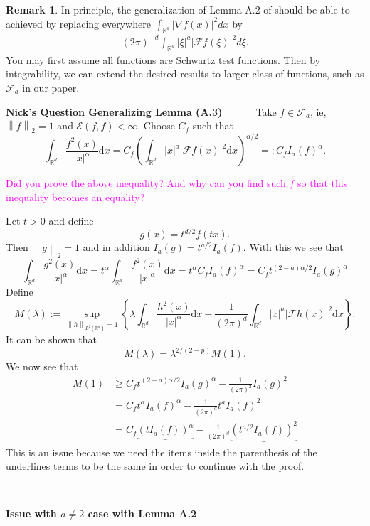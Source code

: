 \documentclass[a4paper,11pt]{article}
\numberwithin{equation}{section}
\theoremstyle{plain}
\theoremstyle{definition}
\newtheorem{remark}[theorem]{Remark}
\newcommand{\ud}{\ensuremath{\mathrm{d} }}
\newcommand{\Norm}[1]{\left\|  #1   \right\|}
\newcommand{\R}{\mathbb{R}}
\newcounter{NQ}
\newenvironment{NickQuestion}[1][] %
{\refstepcounter{NQ}
	\begin{mdframed}[backgroundcolor=lightgray]\textbf{Nick's Question \theNQ \: #1~~}~~~\noindent}%
	{\end{mdframed}}
\numberwithin{NQ}{section}
\numberwithin{LQ}{section}
\numberwithin{ZQ}{section}
\begin{document}
\begin{remark}
	In principle, the generalization of Lemma A.2 of \cite{ChenHuSongXing15AIHP} should be able to
	achieved by replacing everywhere $\int_{\R^d} |\nabla f(x)|^2 dx$ by
	\begin{align*}
		(2\pi)^{-d}\int_{\R^d} |\xi|^a |\mathcal{F}f(\xi)|^2 d\xi.
	\end{align*}
	You may first assume all functions are Schwartz test functions. Then by integrability, we can
	extend the desired results to larger class of functions, such as $\mathcal{F}_a$ in our paper.
\end{remark}

\begin{NickQuestion}[Generalizing Lemma (A.3) \cite{ChenAOP12}]
Take $f \in \mathcal{F}_a$, ie, $\Norm{f}_2 =1$ and $\mathcal{E}(f,f) < \infty$. Choose $C_f$ such that
	\[
		\int_{\R^d} \frac{f^2(x)}{|x|^{\alpha}} \ud x = C_f \left( \int_{\R^d} |x|^a |\mathcal{F}f(x)|^2 \ud x\right)^{\alpha/2} =: C_f I_a(f)^\alpha.
	\]

	\textcolor{magenta}{Did you prove the above inequality? And why can you find such $f$ so that this
	inequality becomes an equality?} \bigskip

Let $t >0$ and define
	\[
		g(x) = t^{d/2}f(tx).
	\]
Then $\Norm{g}_2 =1$ and in addition $I_a(g) = t^{a/2}I_a(f)$. With this we see that
	\[
		\int_{\R^d} \frac{g^2(x)}{|x|^\alpha} \ud x = t^\alpha \int_{\R^d} \frac{f^2(x)}{|x|^{\alpha}} \ud x = t^\alpha C_f I_a(f)^\alpha = C_ft^{(2-a)\alpha/2}I_a(g)^\alpha
	\]
Define
	\[
		M(\lambda) := \sup_{\Norm{h}_{L^2(\R^d)}=1} \left\{ \lambda \int_{\R^d} \frac{h^2(x)}{|x|^\alpha} \ud x - \frac{1}{(2\pi)^d} \int_{\R^d} |x|^a |\mathcal{F} h(x)|^2 \ud x  \right\}.
	\]
It can be shown that
	\[
		M(\lambda) = \lambda^{2/(2-p)}M(1).
	\]
We now see that
	\begin{align*}
		M(1) &\ge C_ft^{(2-a)\alpha/2}I_a(g)^\alpha - \frac{1}{(2\pi)^2}I_a(g)^2
		\\& = C_f t^\alpha I_a(f)^\alpha - \frac{1}{(2\pi)^d}t^aI_a(f)^2
		\\& = C_f \underbrace{(t I_a(f))^\alpha} - \frac{1}{(2\pi)^d}\underbrace{(t^{a/2}I_a(f))^2}
	\end{align*}
This is an issue because we need the items inside the parenthesis of the underlines terms to be the same in order to continue with the proof.

 $\;$

\noindent\textbf{Issue with $ a \not = 2$ case with Lemma A.2 \cite{15AIHP}}


\end{NickQuestion}
\end{document}
